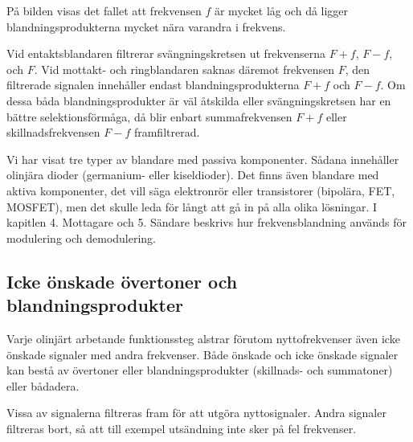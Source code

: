 På bilden visas det fallet att frekvensen \(f\) är mycket låg och då
ligger blandningsprodukterna mycket nära varandra i frekvens.

Vid entaktsblandaren filtrerar svängningskretsen ut frekvenserna \(F +
f\), \(F - f\), och \(F\).
Vid mottakt- och ringblandaren saknas däremot frekvensen \(F\), den filtrerade
signalen innehåller endast blandningsprodukterna \(F + f\) och \(F - f\).
Om dessa båda blandningsprodukter är väl åtskilda eller svängningskretsen har en
bättre selektionsförmåga, då blir enbart summafrekvensen \(F + f\)
eller skillnadsfrekvensen \(F - f\) framfiltrerad.

Vi har visat tre typer av blandare med passiva komponenter.
Sådana innehåller olinjära dioder (germanium- eller kiseldioder).
Det finns även blandare med aktiva komponenter, det vill säga elektronrör eller
transistorer (bipolära, FET, MOSFET), men det skulle leda för långt
att gå in på alla olika lösningar.
I kapitlen 4. Mottagare och 5. Sändare beskrivs hur frekvensblandning används
för modulering och demodulering.

\subsection{Icke önskade övertoner och blandningsprodukter}

Varje olinjärt arbetande funktionssteg alstrar förutom nyttofrekvenser
även icke önskade signaler med andra frekvenser.
Både önskade och icke önskade signaler kan bestå av övertoner eller
blandningsprodukter (skillnads- och summatoner) eller bådadera.

Vissa av signalerna filtreras fram för att utgöra nyttosignaler.
Andra signaler filtreras bort, så att till exempel utsändning inte sker på fel
frekvenser.

